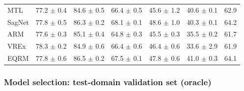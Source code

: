 \documentclass{article}
\begin{document}
\begin{center}
{\begin{tabular}{lcccccc}
        MTL                       & 77.2 $\pm$ 0.4            & 84.6 $\pm$ 0.5            & 66.4 $\pm$ 0.5            & 45.6 $\pm$ 1.2            & 40.6 $\pm$ 0.1            & 62.9                      \\
        SagNet                    & 77.8 $\pm$ 0.5            & 86.3 $\pm$ 0.2            & 68.1 $\pm$ 0.1            & 48.6 $\pm$ 1.0            & 40.3 $\pm$ 0.1            & 64.2                      \\
        ARM                       & 77.6 $\pm$ 0.3            & 85.1 $\pm$ 0.4            & 64.8 $\pm$ 0.3            & 45.5 $\pm$ 0.3            & 35.5 $\pm$ 0.2            & 61.7                      \\
        VREx                      & 78.3 $\pm$ 0.2            & 84.9 $\pm$ 0.6            & 66.4 $\pm$ 0.6            & 46.4 $\pm$ 0.6            & 33.6 $\pm$ 2.9            & 61.9                      \\ \midrule
        EQRM                      & 77.8 $\pm$ 0.6            & 86.5 $\pm$ 0.2            & 67.5 $\pm$ 0.1            & 47.8 $\pm$ 0.6            & 41.0 $\pm$ 0.3            & 64.1                      \\
        \bottomrule
        \end{tabular}}
    \end{center}


%

%
%
%
%
%
%
%
%
%
%
%
%
%
%
%
%
%
%
%
%
%
%
%
%

\subsubsection{Model selection: test-domain validation set (oracle)}\label{sec:additional_exps:domainbed:test-dom}
\end{document}
